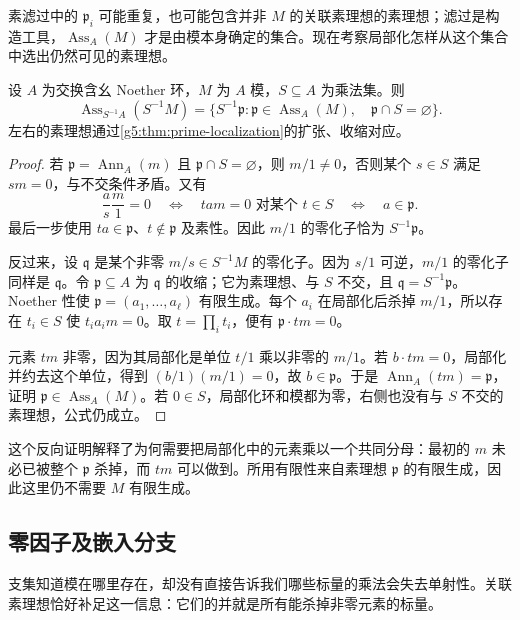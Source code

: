素滤过中的 \(\mathfrak p_i\) 可能重复，也可能包含并非 \(M\) 的关联素理想的素理想；滤过是构造工具，\(\operatorname{Ass}_A(M)\) 才是由模本身确定的集合。现在考察局部化怎样从这个集合中选出仍然可见的素理想。

\begin{theorem}\label{g5:thm:associated-localization}
	设 \(A\) 为交换含幺 Noether 环，\(M\) 为 \(A\) 模，\(S\subseteq A\) 为乘法集。则
	\[
		\operatorname{Ass}_{S^{-1}A}(S^{-1}M)
		=\{S^{-1}\mathfrak p:\mathfrak p\in\operatorname{Ass}_A(M),\quad
		\mathfrak p\cap S=\varnothing\}.
	\]
	左右的素理想通过\cref{g5:thm:prime-localization}的扩张、收缩对应。
\end{theorem}
\begin{proof}
	若 \(\mathfrak p=\operatorname{Ann}_A(m)\) 且 \(\mathfrak p\cap S=\varnothing\)，则 \(m/1\ne0\)，否则某个 \(s\in S\) 满足 \(sm=0\)，与不交条件矛盾。又有
	\[
		\frac as\frac m1=0
		\quad\Longleftrightarrow\quad tam=0\text{ 对某个 }t\in S
		\quad\Longleftrightarrow\quad a\in\mathfrak p.
	\]
	最后一步使用 \(ta\in\mathfrak p\)、\(t\notin\mathfrak p\) 及素性。因此 \(m/1\) 的零化子恰为 \(S^{-1}\mathfrak p\)。

	反过来，设 \(\mathfrak q\) 是某个非零 \(m/s\in S^{-1}M\) 的零化子。因为 \(s/1\) 可逆，\(m/1\) 的零化子同样是 \(\mathfrak q\)。令 \(\mathfrak p\subseteq A\) 为 \(\mathfrak q\) 的收缩；它为素理想、与 \(S\) 不交，且 \(\mathfrak q=S^{-1}\mathfrak p\)。Noether 性使 \(\mathfrak p=(a_1,\ldots,a_\ell)\) 有限生成。每个 \(a_i\) 在局部化后杀掉 \(m/1\)，所以存在 \(t_i\in S\) 使 \(t_i a_im=0\)。取 \(t=\prod_i t_i\)，便有 \(\mathfrak p\cdot tm=0\)。

	元素 \(tm\) 非零，因为其局部化是单位 \(t/1\) 乘以非零的 \(m/1\)。若 \(b\cdot tm=0\)，局部化并约去这个单位，得到 \((b/1)(m/1)=0\)，故 \(b\in\mathfrak p\)。于是 \(\operatorname{Ann}_A(tm)=\mathfrak p\)，证明 \(\mathfrak p\in\operatorname{Ass}_A(M)\)。若 \(0\in S\)，局部化环和模都为零，右侧也没有与 \(S\) 不交的素理想，公式仍成立。
\end{proof}

这个反向证明解释了为何需要把局部化中的元素乘以一个共同分母：最初的 \(m\) 未必已被整个 \(\mathfrak p\) 杀掉，而 \(tm\) 可以做到。所用有限性来自素理想 \(\mathfrak p\) 的有限生成，因此这里仍不需要 \(M\) 有限生成。

\subsection{零因子及嵌入分支}
\label{g5:subsec:0204:03}
支集知道模在哪里存在，却没有直接告诉我们哪些标量的乘法会失去单射性。关联素理想恰好补足这一信息：它们的并就是所有能杀掉非零元素的标量。

